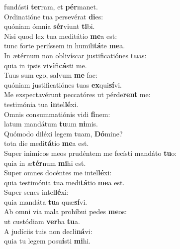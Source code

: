 \evenverse fundásti \textbf{ter}ram, et \textbf{pér}manet.\\
\oddverse Ordinatióne tua persevérat \textbf{di}es:~\*\\
\oddverse quóniam ómnia \textbf{sér}viunt \textbf{ti}bi.\\
\evenverse Nisi quod lex tua meditátio \textbf{me}a est:~\*\\
\evenverse tunc forte periíssem in humili\textbf{tá}te \textbf{me}a.\\
\oddverse In ætérnum non oblivíscar justificatiónes \textbf{tu}as:~\*\\
\oddverse quia in ipsis vi\textbf{vi}fi\textbf{cá}sti me.\\
\evenverse Tuus sum ego, salvum \textbf{me} fac:~\*\\
\evenverse quóniam justificatiónes tuas \textbf{ex}qui\textbf{sí}vi.\\
\oddverse Me exspectavérunt peccatóres ut pérde\textbf{rent} me:~\*\\
\oddverse testimónia tua \textbf{in}tel\textbf{lé}xi.\\
\evenverse Omnis consummatiónis vidi \textbf{fi}nem:~\*\\
\evenverse latum mandátum \textbf{tu}um \textbf{ni}mis.\\
\oddverse Quómodo diléxi legem tuam, \textbf{Dó}mine?~\*\\
\oddverse tota die medi\textbf{tá}tio \textbf{me}a est.\\
\evenverse Super inimícos meos prudéntem me fecísti mandáto \textbf{tu}o:~\*\\
\evenverse quia in æ\textbf{tér}num \textbf{mi}hi est.\\
\oddverse Super omnes docéntes me intel\textbf{lé}xi:~\*\\
\oddverse quia testimónia tua medi\textbf{tá}tio \textbf{me}a est.\\
\evenverse Super senes intel\textbf{lé}xi:~\*\\
\evenverse quia mandáta \textbf{tu}a quæ\textbf{sí}vi.\\
\oddverse Ab omni via mala prohíbui pedes \textbf{me}os:~\*\\
\oddverse ut custódiam \textbf{ver}ba \textbf{tu}a.\\
\evenverse A judíciis tuis non decli\textbf{ná}vi:~\*\\
\evenverse quia tu legem posu\textbf{í}sti \textbf{mi}hi.\\
